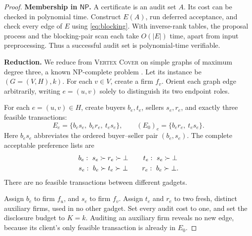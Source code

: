 \documentclass[11pt,letterpaper]{article}
\theoremstyle{definition}
\theoremstyle{remark}
\newcommand{\NP}{\mathsf{NP}}
\newcommand{\botv}{\bot}
\begin{document}
\begin{proof}
\textbf{Membership in \(\NP\).}
A certificate is an audit set \(A\). Its cost can be checked in polynomial time.
Construct \(E(A)\), run deferred acceptance, and check every edge of \(E\) using
\eqref{eq:blocking}. With inverse-rank tables, the proposal process and the
blocking-pair scan each take \(O(|E|)\) time, apart from input preprocessing.
Thus a successful audit set is polynomial-time verifiable.

\medskip
\noindent\textbf{Reduction.}
We reduce from \textsc{Vertex Cover} on simple graphs of maximum degree three,
a known NP-complete problem \cite{garey1976}. Let its instance be
\((G=(V,H),k)\). For each \(v\in V\), create a firm \(f_v\).
Orient each graph edge arbitrarily, writing \(e=(u,v)\) solely to distinguish
its two endpoint roles.

For each \(e=(u,v)\in H\), create buyers \(b_e,t_e\), sellers \(s_e,r_e\), and
exactly three feasible transactions:
\begin{equation}
E_e=\{b_es_e,\ b_er_e,\ t_es_e\},
\qquad
(E_0)_e=\{b_er_e,\ t_es_e\}.
\label{eq:gadget}
\end{equation}
Here \(b_es_e\) abbreviates the ordered buyer--seller pair \((b_e,s_e)\).
The complete acceptable preference lists are
\begin{equation}
\begin{array}{c@{\qquad}c}
b_e:\ s_e\succ r_e\succ\botv
&
t_e:\ s_e\succ\botv
\\[3pt]
s_e:\ b_e\succ t_e\succ\botv
&
r_e:\ b_e\succ\botv .
\end{array}
\label{eq:preferences}
\end{equation}
There are no feasible transactions between different gadgets.

Assign \(b_e\) to firm \(f_u\), and \(s_e\) to firm \(f_v\).
Assign \(t_e\) and \(r_e\) to two fresh, distinct auxiliary firms, used in no
other gadget. Set every audit cost to one, and set the disclosure budget to
\(K=k\). Auditing an auxiliary firm reveals no new edge, because its client's
only feasible transaction is already in \(E_0\).


\end{proof}
\end{document}
